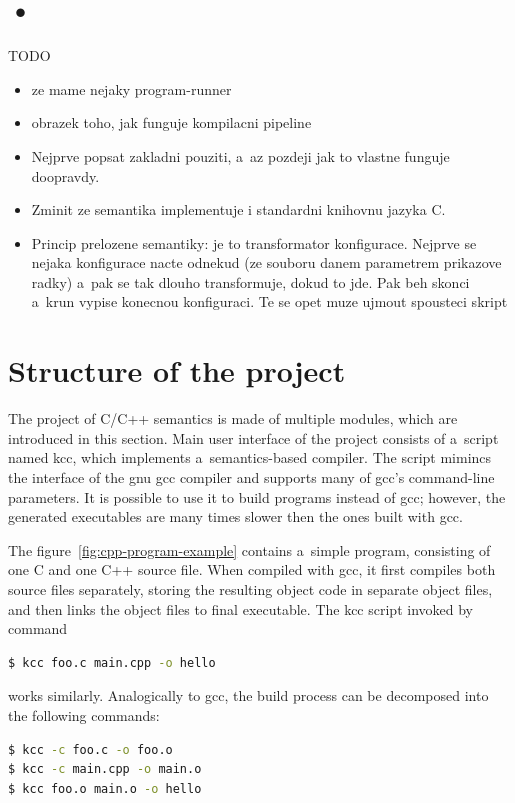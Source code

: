 \documentclass{fithesis3}
\begin{document}
\section{•}

TODO
\begin{itemize}
\item ze mame nejaky program-runner
\item obrazek toho, jak funguje kompilacni pipeline
\item Nejprve popsat zakladni pouziti, a~az pozdeji jak to vlastne funguje doopravdy.
\item Zminit ze semantika implementuje i standardni knihovnu jazyka C.
\item Princip prelozene semantiky: je to transformator konfigurace. Nejprve se nejaka konfigurace nacte odnekud (ze souboru danem parametrem prikazove radky) a~pak se tak dlouho transformuje, dokud to jde. Pak beh skonci a~krun vypise konecnou konfiguraci. Te se opet muze ujmout spousteci skript 
\end{itemize}

\section{Structure of the project}



The project of C/C++ semantics is made of multiple modules, which are introduced in this section. 
Main user interface of the project consists of a~script named kcc, which implements a~semantics-based compiler. The script mimincs the interface of the gnu gcc compiler and supports many of gcc's command-line parameters. It is possible to use it to build programs instead of gcc; however, the generated executables are many times slower then the ones built with gcc.

The figure~\ref{fig:cpp-program-example} contains a~simple program, consisting of one C and one C++ source file. When compiled with gcc, it first compiles both source files separately, storing the resulting object code in separate object files, and then links the object files to final executable. The kcc script invoked by command
\begin{lstlisting}[language=bash]
$ kcc foo.c main.cpp -o hello
\end{lstlisting}
works similarly. Analogically to gcc, the build process can be decomposed into the following commands:
\begin{lstlisting}[language=bash]
$ kcc -c foo.c -o foo.o
$ kcc -c main.cpp -o main.o
$ kcc foo.o main.o -o hello
\end{lstlisting}
\end{document}
